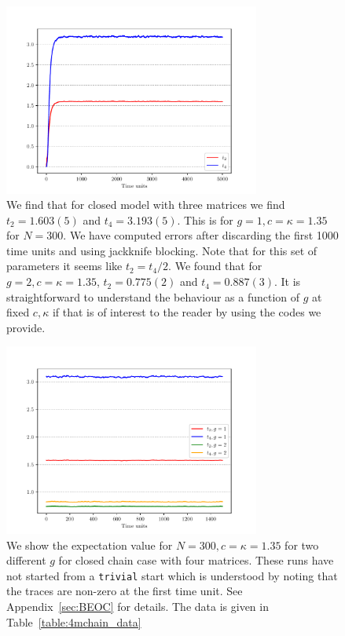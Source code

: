 \documentclass[letter,11pt]{article}
\begin{document}
\begin{figure}[htbp] 
	\centering 
	\includegraphics[width=0.75\textwidth]{figs/3MM_closed.pdf}
	\caption{\label{fig:3MM_closed}We find that for closed model with three matrices we find $t_{2} = 1.603(5)$ and $t_{4} = 3.193(5)$. 
		This is for $g=1, c=\kappa=1.35$ for $N=300$. We have computed errors after discarding the first 1000 time units and 
		using jackknife blocking. Note that for this set of parameters it seems like $t_{2} = t_{4}/2$. We found that 
		for $g=2, c=\kappa=1.35$, $t_{2} = 0.775(2)$ and $t_{4} = 0.887(3)$. It is straightforward to understand the behaviour as a function of $g$ at fixed $c, \kappa$ if that is of interest 
		to the reader by using the codes we provide.}
\end{figure}
\begin{figure}[htbp] 
	\centering 
	\includegraphics[width=0.75\textwidth]{figs/4MM_g1_g2.pdf}
	\caption{\label{fig:4MM_closed1} We show the expectation value for $N=300, c=\kappa=1.35$ for two different $g$ for closed chain case with four matrices. These runs have not started from a \texttt{trivial} start which is understood by noting that the traces are non-zero at the first time unit. See Appendix~\ref{sec:BEOC} for details. The data is given in Table~\ref{table:4mchain_data}}
\end{figure}
\end{document}
